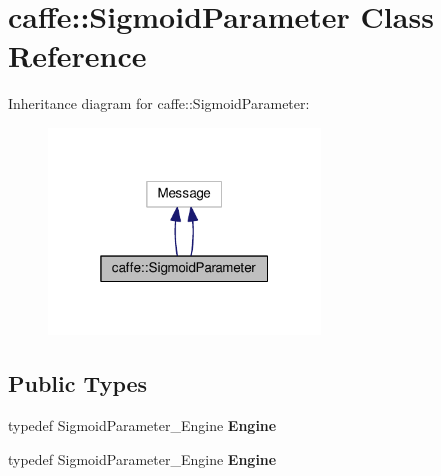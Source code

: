\hypertarget{classcaffe_1_1_sigmoid_parameter}{}\section{caffe\+:\+:Sigmoid\+Parameter Class Reference}
\label{classcaffe_1_1_sigmoid_parameter}


Inheritance diagram for caffe\+:\+:Sigmoid\+Parameter\+:
\nopagebreak
\begin{figure}[H]
\begin{center}
\leavevmode
\includegraphics[width=205pt]{classcaffe_1_1_sigmoid_parameter__inherit__graph}
\end{center}
\end{figure}
\subsection*{Public Types}
\begin{DoxyCompactItemize}
\item 
\mbox{\label{classcaffe_1_1_sigmoid_parameter_a26a56f4e9bd748c9deacea7157873581}} 
typedef Sigmoid\+Parameter\+\_\+\+Engine {\bfseries Engine}
\item 
\mbox{\label{classcaffe_1_1_sigmoid_parameter_a26a56f4e9bd748c9deacea7157873581}} 
typedef Sigmoid\+Parameter\+\_\+\+Engine {\bfseries Engine}
\end{DoxyCompactItemize}
